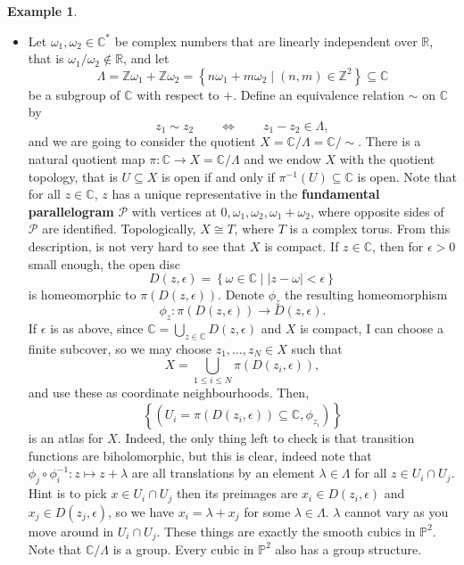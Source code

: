 \documentclass{article}
\newcommand{\Z}{\mathbb{Z}}
\newcommand{\R}{\mathbb{R}}
\newcommand{\C}{\mathbb{C}}
\renewcommand{\P}{\mathbb{P}}
\newcommand{\rb}[1]{\left( #1 \right)}
\newcommand{\cb}[1]{\left\{ #1 \right\}}
\newcommand{\abs}[1]{\left\lvert #1 \right\rvert}
\theoremstyle{definition}\newtheorem{definition}{Definition}[section]
\theoremstyle{definition}\newtheorem{notation}[definition]{Notation}
\theoremstyle{definition}\newtheorem{remark}[definition]{Remark}
\theoremstyle{definition}\newtheorem{example1}[definition]{Example}
\theoremstyle{definition}\newtheorem{fact}{Fact}
\theoremstyle{definition}\newtheorem{exercise}{Exercise}
\theoremstyle{definition}\newtheorem*{example2}{Example}
\begin{document}
\begin{example1}
\begin{itemize}
\item Let $ \omega_1, \omega_2 \in \C^* $ be complex numbers that are linearly independent over $ \R $, that is $ \omega_1 / \omega_2 \notin \R $, and let
$$ \Lambda = \Z\omega_1 + \Z\omega_2 = \cb{n\omega_1 + m\omega_2 \mid \rb{n, m} \in \Z^2} \subseteq \C $$
be a subgroup of $ \C $ with respect to $ + $. Define an equivalence relation $ \sim $ on $ \C $ by
$$ z_1 \sim z_2 \qquad \iff \qquad z_1 - z_2 \in \Lambda, $$
and we are going to consider the quotient $ X = \C / \Lambda = \C / \sim $. There is a natural quotient map $ \pi : \C \to X = \C / \Lambda $ and we endow $ X $ with the quotient topology, that is $ U \subseteq X $ is open if and only if $ \pi^{-1}\rb{U} \subseteq \C $ is open. Note that for all $ z \in \C $, $ z $ has a unique representative in the \textbf{fundamental parallelogram} $ \mathcal{P} $ with vertices at $ 0, \omega_1, \omega_2, \omega_1 + \omega_2 $, where opposite sides of $ \mathcal{P} $ are identified. Topologically, $ X \cong T $, where $ T $ is a complex torus. From this description, is not very hard to see that $ X $ is compact. If $ z \in \C $, then for $ \epsilon > 0 $ small enough, the open disc
$$ D\rb{z, \epsilon} = \cb{\omega \in \C \mid \abs{z - \omega} < \epsilon} $$
is homeomorphic to $ \pi\rb{D\rb{z, \epsilon}} $. Denote $ \phi_z $ the resulting homeomorphism
$$ \phi_z : \pi\rb{D\rb{z, \epsilon}} \to D\rb{z, \epsilon}. $$
If $ \epsilon $ is as above, since $ \C = \bigcup_{z \in \C} D\rb{z, \epsilon} $ and $ X $ is compact, I can choose a finite subcover, so we may choose $ z_1, \dots, z_N \in X $ such that
$$ X = \bigcup_{1 \le i \le N} \pi\rb{D\rb{z_i, \epsilon}}, $$
and use these as coordinate neighbourhoods. Then,
$$ \cb{\rb{U_i = \pi\rb{D\rb{z_i, \epsilon}} \subseteq \C, \phi_{z_i}}} $$
is an atlas for $ X $. Indeed, the only thing left to check is that transition functions are biholomorphic, but this is clear, indeed note that $ \phi_j \circ \phi_i^{-1} : z \mapsto z + \lambda $ are all translations by an element $ \lambda \in \Lambda $ for all $ z \in U_i \cap U_j $. Hint is to pick $ x \in U_i \cap U_j $ then its preimages are $ x_i \in D\rb{z_i, \epsilon} $ and $ x_j \in D\rb{z_j, \epsilon} $, so we have $ x_i = \lambda + x_j $ for some $ \lambda \in \Lambda $. $ \lambda $ cannot vary as you move around in $ U_i \cap U_j $. These things are exactly the smooth cubics in $ \P^2 $. Note that $ \C / \Lambda $ is a group. Every cubic in $ \P^2 $ also has a group structure.
\end{itemize}
\end{example1}
\end{document}

